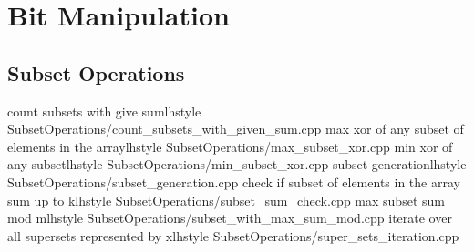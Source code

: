 \section{Bit Manipulation}
   \subsection{Subset Operations}
       {count subsets with give sum}{lhstyle} {SubsetOperations/count_subsets_with_given_sum.cpp}
       {max xor of any subset of elements in the array}{lhstyle} {SubsetOperations/max_subset_xor.cpp}
       {min xor of any subset}{lhstyle} {SubsetOperations/min_subset_xor.cpp}
       {subset generation}{lhstyle} {SubsetOperations/subset_generation.cpp}
       {check if subset of elements in the array sum up to k}{lhstyle} {SubsetOperations/subset_sum_check.cpp}
       {max subset sum mod m}{lhstyle} {SubsetOperations/subset_with_max_sum_mod.cpp}
       {iterate over all supersets represented by x}{lhstyle} {SubsetOperations/super_sets_iteration.cpp}
